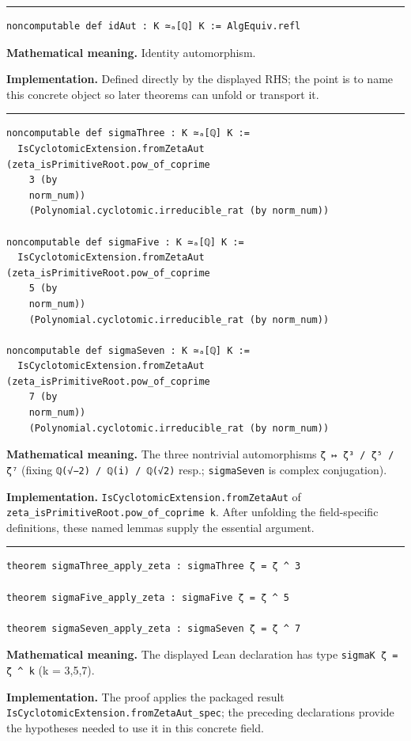 \documentclass[UTF8,a4paper,11pt,fontset=fandol]{ctexart}
\theoremstyle{definition}
\newcommand{\statementsep}{\par\medskip\hrule\medskip}
\begin{document}
\statementsep
\begin{verbatim}
noncomputable def idAut : K ≃ₐ[ℚ] K := AlgEquiv.refl
\end{verbatim}
\noindent\textbf{Mathematical meaning.} Identity automorphism.\par
\noindent\textbf{Implementation.} Defined directly by the displayed RHS; the point is to name this concrete object so later theorems can unfold or transport it.\par
\statementsep
\begin{verbatim}
noncomputable def sigmaThree : K ≃ₐ[ℚ] K :=
  IsCyclotomicExtension.fromZetaAut (zeta_isPrimitiveRoot.pow_of_coprime
    3 (by
    norm_num))
    (Polynomial.cyclotomic.irreducible_rat (by norm_num))

noncomputable def sigmaFive : K ≃ₐ[ℚ] K :=
  IsCyclotomicExtension.fromZetaAut (zeta_isPrimitiveRoot.pow_of_coprime
    5 (by
    norm_num))
    (Polynomial.cyclotomic.irreducible_rat (by norm_num))

noncomputable def sigmaSeven : K ≃ₐ[ℚ] K :=
  IsCyclotomicExtension.fromZetaAut (zeta_isPrimitiveRoot.pow_of_coprime
    7 (by
    norm_num))
    (Polynomial.cyclotomic.irreducible_rat (by norm_num))
\end{verbatim}
\noindent\textbf{Mathematical meaning.} The three nontrivial automorphisms \texttt{ζ ↦ ζ³ /\allowbreak{} ζ⁵ /\allowbreak{} ζ⁷} (fixing \texttt{ℚ(√−2) /\allowbreak{} ℚ(i) /\allowbreak{} ℚ(√2)} resp.; \texttt{sigmaSeven} is complex conjugation).\par
\noindent\textbf{Implementation.} \texttt{IsCyclotomicExtension.\allowbreak{}fromZetaAut} of \texttt{zeta\_\allowbreak{}isPrimitiveRoot.\allowbreak{}pow\_\allowbreak{}of\_\allowbreak{}coprime k}. After unfolding the field-specific definitions, these named lemmas supply the essential argument.\par
\statementsep
\begin{verbatim}
theorem sigmaThree_apply_zeta : sigmaThree ζ = ζ ^ 3

theorem sigmaFive_apply_zeta : sigmaFive ζ = ζ ^ 5

theorem sigmaSeven_apply_zeta : sigmaSeven ζ = ζ ^ 7
\end{verbatim}
\noindent\textbf{Mathematical meaning.} The displayed Lean declaration has type \texttt{sigmaK ζ = ζ \textasciicircum{} k} (k = 3,5,7).\par
\noindent\textbf{Implementation.} The proof applies the packaged result \texttt{IsCyclotomicExtension.\allowbreak{}fromZetaAut\_\allowbreak{}spec}; the preceding declarations provide the hypotheses needed to use it in this concrete field.\par
\end{document}
